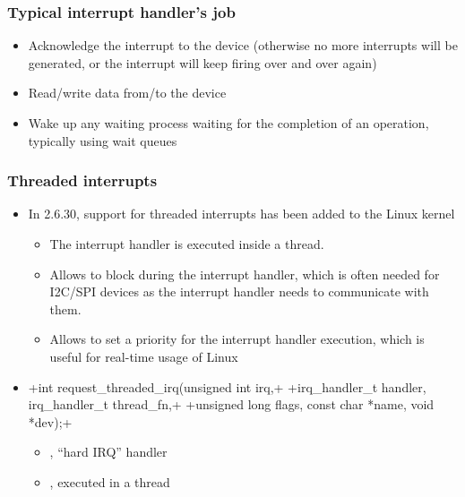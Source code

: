 \begin{frame}
  \frametitle{Typical interrupt handler's job}
  \begin{itemize}
  \item Acknowledge the interrupt to the device (otherwise no more
    interrupts will be generated, or the interrupt will keep firing
    over and over again)
  \item Read/write data from/to the device
  \item Wake up any waiting process waiting for the completion of an
    operation, typically using wait queues
\end{itemize}
\end{frame}

\begin{frame}[fragile]
  \frametitle{Threaded interrupts}
  \begin{itemize}
  \item In 2.6.30, support for threaded interrupts has been added to
    the Linux kernel
    \begin{itemize}
    \item The interrupt handler is executed inside a thread.
    \item Allows to block during the interrupt handler, which is often
      needed for I2C/SPI devices as the interrupt handler needs to
      communicate with them.
    \item Allows to set a priority for the interrupt handler
      execution, which is useful for real-time usage of Linux
    \end{itemize}
  \item {}+int request_threaded_irq(unsigned int irq,+
    +irq_handler_t handler, irq_handler_t thread_fn,+
    +unsigned long flags, const char *name, void *dev);+
    \begin{itemize}
    \item {}, ``hard IRQ'' handler
    \item {}, executed in a thread
    \end{itemize}
  \end{itemize}
\end{frame}


